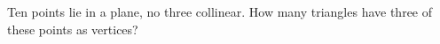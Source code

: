 Ten points lie in a plane, no three collinear. How many triangles have three of these points as vertices?
